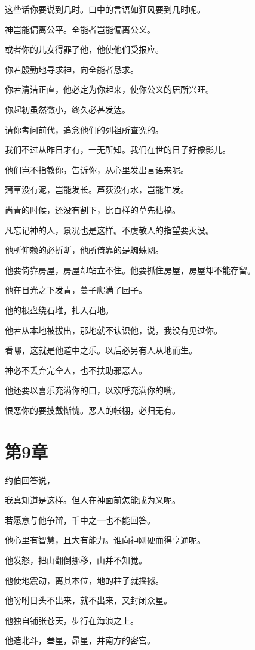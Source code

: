 \documentclass[12pt,oneside]{book}
\begin{document}
这些话你要说到几时。口中的言语如狂风要到几时呢。

神岂能偏离公平。全能者岂能偏离公义。

或者你的儿女得罪了他，他使他们受报应。

你若殷勤地寻求神，向全能者恳求。

你若清洁正直，他必定为你起来，使你公义的居所兴旺。

你起初虽然微小，终久必甚发达。

请你考问前代，追念他们的列祖所查究的。

我们不过从昨日才有，一无所知。我们在世的日子好像影儿。

他们岂不指教你，告诉你，从心里发出言语来呢。

蒲草没有泥，岂能发长。芦荻没有水，岂能生发。

尚青的时候，还没有割下，比百样的草先枯槁。

凡忘记神的人，景况也是这样。不虔敬人的指望要灭没。

他所仰赖的必折断，他所倚靠的是蜘蛛网。

他要倚靠房屋，房屋却站立不住。他要抓住房屋，房屋却不能存留。

他在日光之下发青，蔓子爬满了园子。

他的根盘绕石堆，扎入石地。

他若从本地被拔出，那地就不认识他，说，我没有见过你。

看哪，这就是他道中之乐。以后必另有人从地而生。

神必不丢弃完全人，也不扶助邪恶人。

他还要以喜乐充满你的口，以欢呼充满你的嘴。

恨恶你的要披戴惭愧。恶人的帐棚，必归无有。



\chapter{第9章}
约伯回答说，

我真知道是这样。但人在神面前怎能成为义呢。

若愿意与他争辩，千中之一也不能回答。

他心里有智慧，且大有能力。谁向神刚硬而得亨通呢。

他发怒，把山翻倒挪移，山并不知觉。

他使地震动，离其本位，地的柱子就摇撼。

他吩咐日头不出来，就不出来，又封闭众星。

他独自铺张苍天，步行在海浪之上。

他造北斗，叁星，昴星，并南方的密宫。
\end{document}
